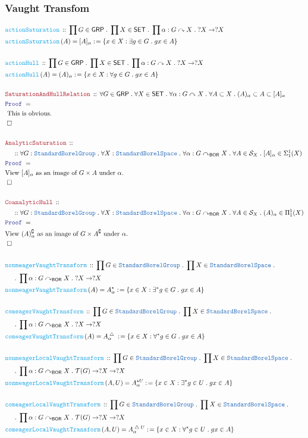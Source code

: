 \documentclass[12pt]{scrartcl}
\newcommand{\TYPE}[1]{\textcolor{NavyBlue}{\mathtt{#1}}}
\newcommand{\FUNC}[1]{\textcolor{Cerulean}{\mathtt{#1}}}
\newcommand{\LOGIC}[1]{\textcolor{Blue}{\mathtt{#1}}}
\newcommand{\THM}[1]{\textcolor{Maroon}{\mathtt{#1}}}
\renewcommand{\.}{\; . \;}
\newcommand{\de}{: \kern 0.1pc =}
\newcommand{\Act}[1]{\left( #1 \right)}
\newcommand{\Theorem}[2]{& \THM{#1} \, :: \, #2 \\ & \Proof = \\ }
\newcommand{\DeclareFunc}[2]{& \FUNC{#1} \, :: \, #2 \\}
\newcommand{\DefineNamedFunc}[4]{&  \FUNC{#1}\Act{#2} = #3 \de #4 \\}
\newcommand{\NewLine}{\\ & \kern 1pc}
\newcommand{\Page}[1]{ \begin{align*} #1 \end{align*}   }
\newcommand{\du}{\; \triangle \;}
\renewcommand{\c}{\complement}
\newcommand{\Explain}[1]{& \text{#1.} \\}
\newcommand{\QED}{\; \square}
\newcommand{\EndProof}{& \QED \\}
\newcommand{\Proof}{\LOGIC{Proof} \; }
\newcommand{\SET}{\mathsf{SET}}
\newcommand{\T}{\mathcal{T}}
\newcommand{\SBS}{\TYPE{StandardBorelSpace}}
\newcommand{\BOR}{\mathsf{BOR}}
\renewcommand{\S}{\mathcal{S}}
\newcommand{\ActOn}{\curvearrowright}
\newcommand{\GRP}{\mathsf{GRP}}
\newcommand{\SBG}{\TYPE{StandardBorelGroup}}
\renewcommand{\S}{\mathcal{S}}
\begin{document}
\subsubsection{Vaught Transfom}
\Page{
	\DeclareFunc{actionSaturation}
	{
		\prod G \in \GRP \. 
		\prod X \in \SET \.
		\prod \alpha : G \ActOn X \.
		?X \to ?X
	}
	\DefineNamedFunc{actionSaturation}{A}{[A]_\alpha}
	{
		\{  x \in X : \exists g \in G \. gx \in A \}
	}
	\\
	\DeclareFunc{actionHull}
	{
		\prod G \in \GRP \. 
		\prod X \in \SET \.
		\prod \alpha : G \ActOn X \.
		?X \to ?X
	}
	\DefineNamedFunc{actionHull}{A}{(A)_\alpha}
	{
		\{  x \in X : \forall g \in G \. gx \in A \}
	}
	\\
	\Theorem{SaturationAndHullRelation}
	{
		\forall G \in \GRP \.
		\forall X \in \SET \.
		\forall \alpha : G \ActOn X \.
		\forall A \subset X \.
		(A)_\alpha \subset A \subset [A]_\alpha
	}
	\Explain{ This is obvious}
	\EndProof
	\\
	\Theorem{AnalyticSaturation}
	{
		\NewLine ::
		\forall G : \SBG \.
		\forall X : \SBS \.
		\forall \alpha : G \ActOn_\BOR X \.
		\forall A \in \S_X \.
		[A]_\alpha \in \Sigma^1_1(X)
	}
	\Explain{View $[A]_\alpha$ as an image of $G \times A$ under $\alpha$}
	\EndProof
	\\
	\Theorem{CoanalyticHull}
	{
		\NewLine ::
		\forall G : \SBG \.
		\forall X : \SBS \.
		\forall \alpha : G \ActOn_\BOR X \.
		\forall A \in \S_X \.
		(A)_\alpha \in \Pi^1_1(X)
	}
	\Explain{View $(A)_\alpha^\c$ as an image of $G \times A^\c$ under $\alpha$}
	\EndProof
	\\
	\DeclareFunc{nonmeagerVaughtTransform}
	{
		\prod G \in \SBG \. 
		\prod X \in \SBS \. \NewLine \.
		\prod \alpha : G \ActOn_\BOR X \.
		?X \to ?X
	}
	\DefineNamedFunc{nonmeagerVaughtTransform}{A}{A^\star_\alpha}
	{
		\{  x \in X : \exists^* g \in G \. gx \in A \}
	}
	\\
	\DeclareFunc{comeagerVaughtTransform}
	{
		\prod G \in \SBG \. 
		\prod X \in \SBS \. \NewLine \.
		\prod \alpha : G \ActOn_\BOR X \.
		?X \to ?X
	}
	\DefineNamedFunc{comeagerVaughtTransform}{A}{A^{\du}_\alpha}
	{
		\{  x \in X : \forall^* g \in G \. gx \in A \}
	}
	\\
	\DeclareFunc{nonmeagerLocalVaughtTransform}
	{
		\prod G \in \SBG \. 
		\prod X \in \SBS \. \NewLine \.
		\prod \alpha : G \ActOn_\BOR X \.
		\T(G) \to ?X \to ?X
	}
	\DefineNamedFunc{nonmeagerLocalVaughtTransform}{A,U}{A^{\star U}_\alpha}
	{
		\{  x \in X : \exists^* g \in U \. gx \in A \}
	}
	\\
	\DeclareFunc{comeagerLocalVaughtTransform}
	{
		\prod G \in \SBG \. 
		\prod X \in \SBS \. \NewLine \.
		\prod \alpha : G \ActOn_\BOR X \.
		\T(G) \to ?X \to ?X
	}
	\DefineNamedFunc{comeagerLocalVaughtTransform}{A,U}{A^{\du U}_\alpha}
	{
		\{  x \in X : \forall^* g \in U \. gx \in A \}
	}
}
\end{document}
